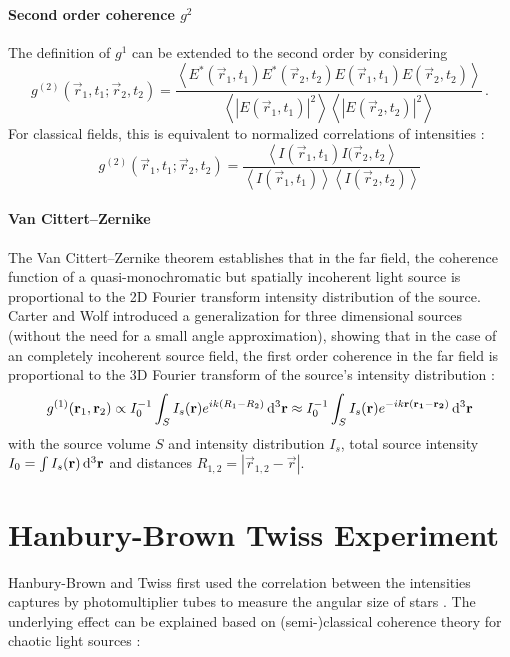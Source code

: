\paragraph{Second order coherence $g^2$}
The definition of $g^1$ can be extended to the second order by considering
\begin{equation}
	g^{(2)}(\vec{r}_1,t_1;\vec{r}_2,t_2)= 
	\frac{\left< E^*(\vec{r}_1,t_1)E^*(\vec{r}_2,t_2)E(\vec{r}_1,t_1)E(\vec{r}_2,t_2) \right>}{\left<\left | E(\vec{r}_1,t_1)\right |^2 \right> \left< \left |E(\vec{r}_2,t_2)\right |^2 \right>} \,.	
\end{equation}
For classical fields, this is equivalent  to normalized correlations of intensities \cite{goodman2000}:
\begin{equation}
	g^{(2)}(\vec{r}_1,t_1;\vec{r}_2,t_2)= 
		\frac{\left< I(\vec{r}_1,t_1)I(\vec{r}_2,t_2 \right>}{\left<I(\vec{r}_1,t_1)\right>\left<I(\vec{r}_2,t_2)\right>}	
		\label{eq:g2}
\end{equation}


\paragraph{Van Cittert–Zernike}
The Van Cittert–Zernike theorem establishes that in the far field, the coherence function of a 
quasi-monochromatic but spatially incoherent light source is proportional to the 2D Fourier transform intensity distribution of the source. Carter and Wolf introduced a generalization for three dimensional sources (without the need for a small angle approximation), showing that in the case of an completely incoherent source field, the first order coherence in the far field is proportional to the 3D Fourier transform of the source's intensity distribution \cite{rosen1996, goodman2005, carter1981}:
\begin{equation}
	g^{(1)}(\mathbf{r}_1,\mathbf{r}_2) \propto I_0^{-1} \int_{S} I_s(\mathbf{r}) e^{ik(R_1-R_2)} \operatorname{\mathrm{d}^3 \!} \mathbf{r} \approx I_0^{-1} \int_{S} I_s(\mathbf{r}) e^{-ik\mathbf{r}(\mathbf{r_1}-\mathbf{r_2})} \operatorname{\mathrm{d}^3 \!} \mathbf{r}
	\label{eq:vcz}
\end{equation}
with the source volume $S$ and intensity distribution $I_s$, total source intensity $I_0=\int I_s(\mathbf{r}) \operatorname{\mathrm{d}^3 \!} \mathbf{r}$ and distances $R_{1,2}=\left|\vec{r}_{1,2}-\vec{r}\right|$.


\section{Hanbury-Brown Twiss Experiment}
Hanbury-Brown and Twiss first used the correlation between the intensities captures by photomultiplier tubes to measure the angular size of stars  \cite{hanbury1956}. The underlying effect can be explained based on (semi-)classical coherence theory for chaotic light sources \cite{baym1997,goodman2000}:

